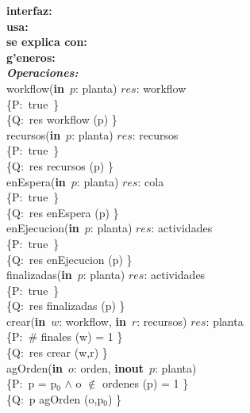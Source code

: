 \documentclass[a4paper,10pt]{article}
\begin{document}
\indent \noindent \textbf{interfaz:} \\
\indent \textbf{usa:}\\
\indent \textbf{se explica con:} \\
\indent \textbf{g'eneros:} \\



\noindent \textbf{\textsl{Operaciones:}}\\

\noindent workflow(\textbf{in}\ $p$: planta)  \en $res$: workflow \ \ \ \ \ \\
\indent \{P:\ true\ \}  \\
\indent \{Q:\ res \igobs workflow (p) \}\\

\noindent recursos(\textbf{in}\ $p$: planta)  \en $res$: recursos \ \ \ \ \ \\
\indent \{P:\ true\ \}  \\
\indent \{Q:\ res \igobs recursos (p) \}\\

\noindent enEspera(\textbf{in}\ $p$: planta)  \en $res$: cola \ \ \ \ \ \\
\indent \{P:\ true\ \}  \\
\indent \{Q:\ res \igobs enEspera (p) \}\\

\noindent enEjecucion(\textbf{in}\ $p$: planta)  \en $res$: actividades \ \ \ \ \ \\
\indent \{P:\ true\ \}  \\
\indent \{Q:\ res \igobs enEjecucion (p) \}\\

\noindent finalizadas(\textbf{in}\ $p$: planta)  \en $res$: actividades \ \ \ \ \ \\
\indent \{P:\ true\ \}  \\
\indent \{Q:\ res \igobs finalizadas (p) \}\\

\noindent crear(\textbf{in}\ $w$: workflow, \textbf{in}\ $r$: recursos)  \en $res$: planta \ \ \ \ \ \\
\indent \{P:\ $\#$ finales (w) = 1 \}  \\
\indent \{Q:\ res \igobs crear (w,r) \}\\

\noindent agOrden(\textbf{in}\ $o$: orden, \textbf{inout}\ $p$: planta)  \ \ \ \ \ \\
\indent \{P:\ p = p$_0$ $\wedge$ o $\notin$ ordenes (p) = 1 \}  \\
\indent \{Q:\ p \igobs agOrden (o,p$_0$) \}\\
\end{document}
